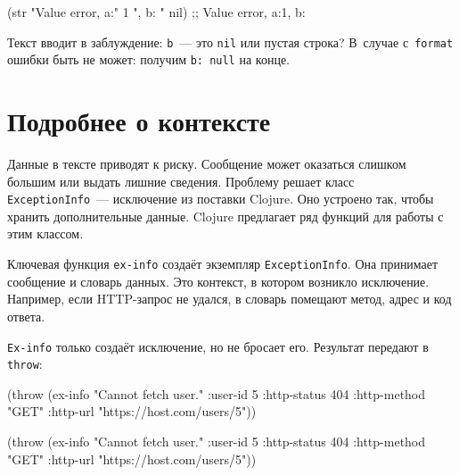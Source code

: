 \begin{english}
  \begin{clojure}
(str "Value error, a:" 1 ", b: " nil)
;; Value error, a:1, b:
  \end{clojure}
\end{english}

\noindent
Текст вводит в заблуждение: \verb|b|~--- это \verb|nil| или пустая строка?
В~случае с~\verb|format| ошибки быть не может: получим \verb|b: null| на конце.

\section{Подробнее о контексте}


Данные в тексте приводят к риску. Сообщение может оказаться слишком большим или
выдать лишние сведения. Проблему решает класс \verb|ExceptionInfo|~---
исключение из поставки Clojure. Оно устроено так, чтобы хранить дополнительные
данные. Clojure предлагает ряд функций для работы с этим классом.

Ключевая функция \verb|ex-info| создаёт экземпляр \verb|ExceptionInfo|. Она
принимает сообщение и словарь данных. Это контекст, в котором возникло
исключение. Например, если HTTP-запрос не удался, в словарь помещают метод,
адрес и код ответа.

\verb|Ex-info| только создаёт исключение, но не бросает его. Результат
передают в \verb|throw|:

\ifx\DEVICETYPE\MOBILE

\begin{english}
  \begin{clojure}
(throw (ex-info
        "Cannot fetch user."
        {:user-id 5
         :http-status 404
         :http-method "GET"
         :http-url
         "https://host.com/users/5"}))
  \end{clojure}
\end{english}

\else

\begin{english}
  \begin{clojure}
(throw (ex-info
        "Cannot fetch user."
        {:user-id 5
         :http-status 404
         :http-method "GET"
         :http-url "https://host.com/users/5"}))
  \end{clojure}
\end{english}

